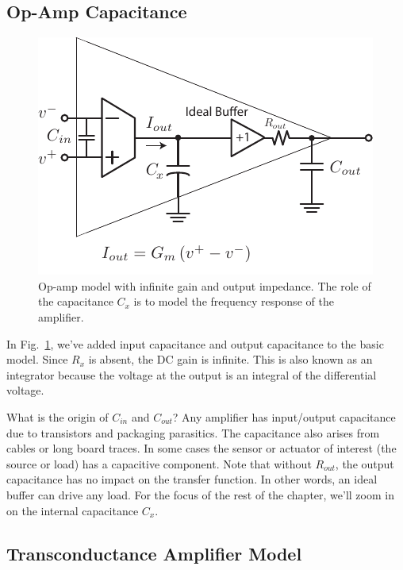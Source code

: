 \subsection{Op-Amp Capacitance}

\begin{figure}[tb]
\begin{center}
\includegraphics[scale=1]{opamp_ota_model_cap}
\end{center}
\caption{Op-amp model with infinite gain and output impedance.  The role of the capacitance $C_x$ is to model the frequency response of the amplifier.} \label{fig:opamp_ota_model_cap}
\end{figure}

In Fig.~\ref{fig:opamp_ota_model_cap}, we've added input capacitance and output capacitance to the basic model.  Since $R_x$ is absent, the DC gain is infinite.  This is also known as an integrator because the voltage at the output is an integral of the differential voltage.    

What is the origin of $C_{in}$ and $C_{out}$?  Any amplifier has input/output capacitance due to transistors and packaging parasitics.  The capacitance also arises from cables or long board traces.  In some cases the sensor or actuator of interest (the source or load) has a capacitive component. Note that without $R_{out}$, the output capacitance has no impact on the transfer function.  In other words, an ideal buffer can drive any load.  For the focus of the rest of the chapter, we'll zoom in on the internal capacitance $C_x$.
 


\subsection{Transconductance Amplifier Model}

